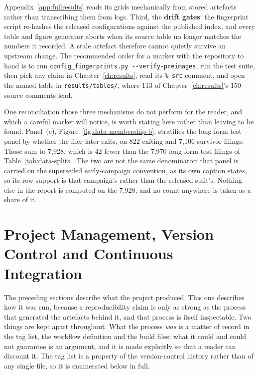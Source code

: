 Appendix~\ref{app:fullresults}
reads its grids mechanically from stored artefacts rather than transcribing them
from logs. Third, the \textbf{drift gates}: the fingerprint script re-hashes the
released configurations against the published index, and every table and figure
generator aborts when its source table no longer matches the numbers it
recorded. A stale artefact therefore cannot quietly survive an upstream change.
The recommended order for a marker with the repository to hand is to run
\texttt{config\_fingerprints.py -{}-verify-preimages}, run the test suite, then
pick any claim in Chapter~\ref{ch:results}, read its \texttt{\% src} comment, and
open the named table in \texttt{results/tables/}, where 113 of Chapter~\ref{ch:results}'s 150 source comments lead.

One reconciliation those three mechanisms do not perform for the reader, and
which a careful marker will notice, is worth stating here rather than leaving
to be found. Panel~(c), Figure~\ref{fig:data-membership-b}, stratifies the
long-form test panel by whether the filer later exits, on 822 exiting and
7{,}106 survivor filings. Those sum to 7{,}928, which is 42 fewer than the
7{,}970 long-form test filings of Table~\ref{tab:data-splits}. The two are not
the same denominator: that panel is carried on the superseded early-campaign
convention, as its own caption states, so its row support is that campaign's
rather than the released split's. Nothing else in
the report is computed on the 7{,}928, and no count anywhere is taken as a
share of it.

\FloatBarrier
\section{Project Management, Version Control and Continuous Integration}
\label{app:external:process}

The preceding sections describe what the project produced. This one describes
how it was run, because a reproducibility claim is only as strong as the process
that generated the artefacts behind it, and that process is itself inspectable.
Two things are kept apart throughout. What the process \emph{was} is a matter of
record in the tag list, the workflow definition and the build files; what it
could and could not guarantee is an argument, and it is made explicitly so that
a reader can discount it. The tag list is a property of the version-control
history rather than of any single file, so it is enumerated below in full.

